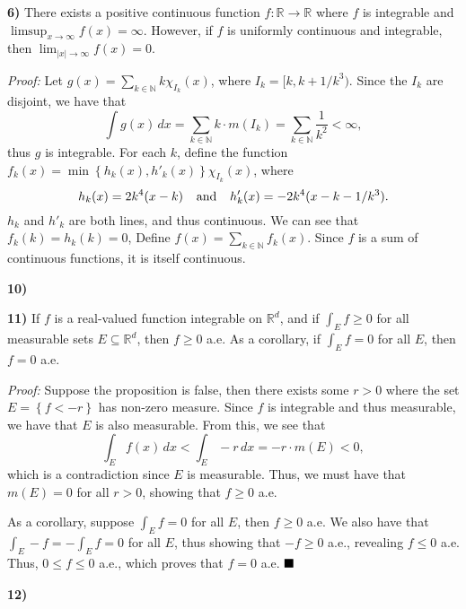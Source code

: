 \documentclass[12pt]{article}
\newcommand{\N}{\ensuremath{\mathbb{N}}}
\newcommand{\R}{\ensuremath{\mathbb{R}}}
\newcommand{\braceb}[1]{\left\{#1\right\}}
\newcommand{\vertb}[1]{\left\vert#1\right\vert}
\newcommand{\proof}{\textit{Proof: }}
\newcommand{\done}{\ensuremath{\strut\hfill\blacksquare}}
\renewcommand{\t}[1]{\text{ #1 }}
\begin{document}
\pagestyle{fancy}

\setlength{\parindent}{0in}
\setlength{\parskip}{0.1in}

\textbf{6)}
There exists a positive continuous function \( f : \R \to \R \) where
\( f \) is integrable and \( \limsup_{x \to \infty} f(x) = \infty \).
However, if \( f \) is uniformly continuous and integrable, then
\( \lim_{\vertb{x} \to \infty} f(x) = 0 \).

\proof
Let \( g(x) = \sum_{k \in \N} k \chi_{I_k}(x) \), where
\( I_k = [k, k + 1/k^3) \).
Since the \( I_k \) are disjoint, we have that
\[
	\int g(x) \, dx
	= \sum_{k \in \N} k \cdot m(I_k)
	= \sum_{k \in \N} \frac{1}{k^2}
	< \infty,
\]
thus \( g \) is integrable.
For each \( k \), define the function
\( f_k(x) = \min\braceb{h_k(x), h'_k(x)} \chi_{I_k}(x) \), where
\[
	h_k(x) = 2k^4(x - k)
	\hspace{0.1in}
	\t{and}
	\hspace{0.1in}
	h'_k(x) = -2k^4(x - k - 1/k^3).
\]
\( h_k \) and \( h'_k \) are both lines, and thus continuous.
We can see that \( f_k(k) = h_k(k) = 0 \),
Define \( f(x) = \sum_{k \in \N} f_k(x) \).
Since \( f \) is a sum of continuous functions, it is itself continuous.

\textbf{10)}

\textbf{11)}
If \( f \) is a real-valued function integrable on \( \R^d \), and if
\( \int_E f \geq 0 \) for all measurable sets \( E \subseteq \R^d \), then
\( f \geq 0 \) a.e.
As a corollary, if \( \int_E f = 0 \) for all \( E \), then \( f = 0 \) a.e.

\proof
Suppose the proposition is false, then there exists some \( r > 0 \) where the
set \( E = \braceb{f < -r} \) has non-zero measure.
Since \( f \) is integrable and thus measurable, we have that \( E \) is also
measurable.
From this, we see that
\[
	\int_E f(x) \, dx
	< \int_E -r \, dx
	= -r \cdot m(E)
	< 0,
\]
which is a contradiction since \( E \) is measurable.
Thus, we must have that \( m(E) = 0 \) for all \( r > 0 \), showing that
\( f \geq 0 \) a.e.

As a corollary, suppose \( \int_E f = 0 \) for all \( E \), then \( f \geq 0 \)
a.e.
We also have that \( \int_E -f = -\int_E f = 0 \) for all \( E \), thus showing
that \( -f \geq 0 \) a.e., revealing \( f \leq 0 \) a.e.
Thus, \( 0 \leq f \leq 0 \) a.e., which proves that \( f = 0 \) a.e.
\done

\textbf{12)}

{}
\end{document}
